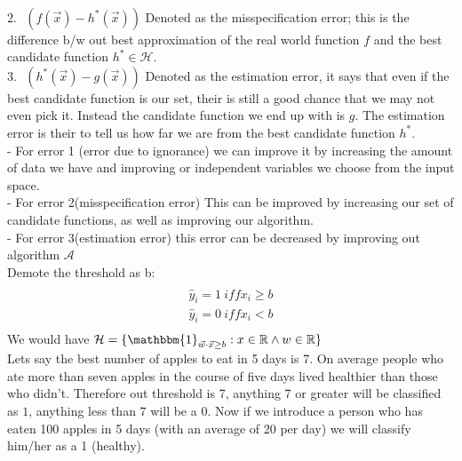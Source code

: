 \documentclass[12pt]{article}
\begin{document}
\begin{enumerate}
\\$ 2.\text{ } ( f(\vec{x})- h^*(\vec{x}))$ Denoted as the misspecification error; this is the difference b/w out best approximation of the real world function $f$ and the best candidate function $ h^* \in \mathcal{H}$. 
\\$ 3.\text{ } ( h^*(\vec{x})- g(\vec{x}))$ Denoted as the estimation error, it says that even if the best candidate function is our set, their is still a good chance that we may not even pick it. Instead the candidate function we end up with is $g$. The estimation error is their to tell us how far we are from the best candidate function $h^*$.
\\- For error 1 (error due to ignorance) we can improve it by increasing the amount of data we have and improving or independent variables we choose from the input space.
\\- For error 2(misspecification error) This can be improved by increasing our set of candidate functions, as well as improving our algorithm.
\\- For error 3(estimation error) this error can be decreased by improving out algorithm $\mathcal{A}$
\\Demote the threshold as b:
\begin{eqnarray*}\\
\hat y_{i}=1 \ iff   x_{i}  \geq b \\
\hat y_{i}=0  \ iff   x_{i}  < b \\
\end{eqnarray*}
We would have $\mathcal{H} = \{ \mathbbm{1}_{ \vec{w}\cdot \vec{x}  \geq b}  :  x\in \mathbb{R} \land w\in \mathbb{R} \}$
\\Lets say the best number of apples to eat in 5 days is 7. On average people who ate more than seven apples in the course of five days lived healthier than those who didn't. Therefore out threshold is 7, anything 7 or greater will be classified as $1$, anything less than $7$ will be a 0.  Now if we introduce a person who has eaten 100 apples in 5 days (with an average of 20 per day) we will classify him/her as a 1 (healthy).
\end{enumerate}
\end{document}
